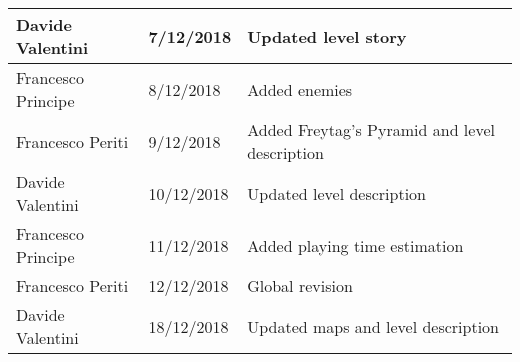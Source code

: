 \begin{longtable}[H]{|l|l|l|}
Davide Valentini & 7/12/2018 & Updated level story \\ \hline
Francesco Principe & 8/12/2018 & Added enemies \\ \hline
Francesco Periti & 9/12/2018 & Added Freytag's Pyramid and level description \\ \hline
Davide Valentini & 10/12/2018 & Updated level description \\ \hline
Francesco Principe & 11/12/2018 & Added playing time estimation \\ \hline
Francesco Periti & 12/12/2018 & Global revision \\ \hline

Davide Valentini & 18/12/2018 & Updated maps and level description \\ \hline
\end{longtable}
